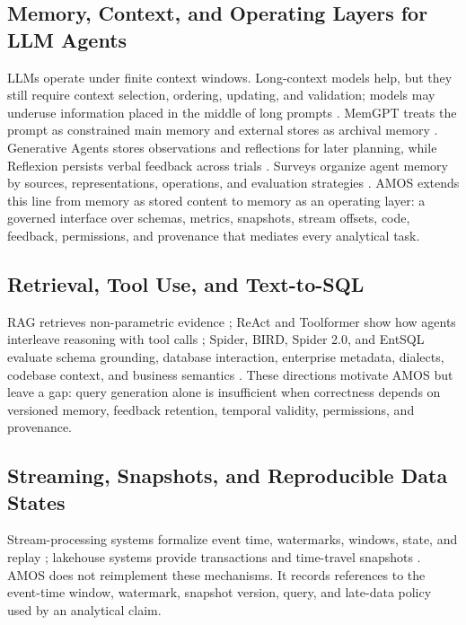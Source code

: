 \documentclass[10pt]{article}
\newcommand{\amos}{\textsc{AMOS}\xspace}
\begin{document}
\subsection{Memory, Context, and Operating Layers for LLM Agents}
LLMs operate under finite context windows. Long-context models help, but they still require context selection, ordering, updating, and validation; models may underuse information placed in the middle of long prompts \cite{lostinthemiddle}. MemGPT treats the prompt as constrained main memory and external stores as archival memory \cite{memgpt}. Generative Agents stores observations and reflections for later planning, while Reflexion persists verbal feedback across trials \cite{generativeagents,reflexion}. Surveys organize agent memory by sources, representations, operations, and evaluation strategies \cite{memorysurvey}. \amos extends this line from memory as stored content to memory as an operating layer: a governed interface over schemas, metrics, snapshots, stream offsets, code, feedback, permissions, and provenance that mediates every analytical task.

\subsection{Retrieval, Tool Use, and Text-to-SQL}
RAG retrieves non-parametric evidence \cite{rag}; ReAct and Toolformer show how agents interleave reasoning with tool calls \cite{react,toolformer}; Spider, BIRD, Spider 2.0, and EntSQL evaluate schema grounding, database interaction, enterprise metadata, dialects, codebase context, and business semantics \cite{spider,bird,spider2,entsql}. These directions motivate \amos but leave a gap: query generation alone is insufficient when correctness depends on versioned memory, feedback retention, temporal validity, permissions, and provenance.

\subsection{Streaming, Snapshots, and Reproducible Data States}
Stream-processing systems formalize event time, watermarks, windows, state, and replay \cite{millwheel,dataflow,flink}; lakehouse systems provide transactions and time-travel snapshots \cite{deltalake}. \amos does not reimplement these mechanisms. It records references to the event-time window, watermark, snapshot version, query, and late-data policy used by an analytical claim.
\end{document}
